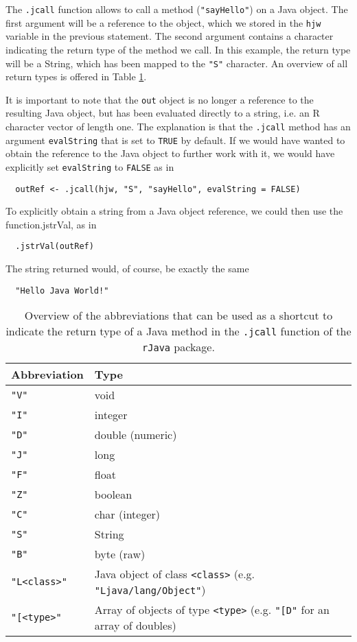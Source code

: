 \documentclass[a4paper, 11pt]{article}
\begin{document}
The \texttt{.jcall} function allows to call a method (\texttt{"sayHello"}) on a Java object.
The first argument will be a reference to the object, which we stored in the \texttt{hjw} variable
in the previous statement. The second argument contains a character indicating the return type
of the method we call. In this example, the return type will be a String, which has been mapped
to the \texttt{"S"} character. An overview of all return types is offered in Table 
\ref{tab:returntypes}. 

It is important to note that the \texttt{out} object is
no longer a reference to the resulting Java object, but has been evaluated directly
to a string, i.e. an R character vector of length one. The explanation is that the
\texttt{.jcall} method has an argument \texttt{evalString} that is set to 
\texttt{TRUE} by default. If we would have wanted to obtain the reference to
the Java object to further work with it, we would have explicitly 
set \texttt{evalString} to \texttt{FALSE} as in 

\begin{verbatim}
  outRef <- .jcall(hjw, "S", "sayHello", evalString = FALSE) 
\end{verbatim}

To explicitly obtain a string from a Java object reference,
we could then use the function{.jstrVal}, as in
\begin{verbatim}
  .jstrVal(outRef)
\end{verbatim}

The string returned would, of course, be exactly the same
\begin{verbatim}
  "Hello Java World!"
\end{verbatim}

\begin{table}
  \begin{tabular}{lp{8cm}}
  \hline
  Abbreviation   &  Type \\
  \hline
    \texttt{"V"} & void \\
    \texttt{"I"} & integer \\
    \texttt{"D"} & double (numeric) \\  
    \texttt{"J"} & long \\
    \texttt{"F"} & float \\
    \texttt{"Z"} & boolean \\
    \texttt{"C"} & char (integer)\\
    \texttt{"S"} & String \\
    \texttt{"B"} & byte (raw)\\
    \texttt{"L<class>"} & Java object of class \texttt{<class>} 
                       (e.g. \texttt{"Ljava/lang/Object"})\\
    \texttt{"[<type>"}  & Array of objects of type \texttt{<type>} 
                       (e.g. \texttt{"[D"} for an array of doubles)\\
  \hline
  \end{tabular}
  \caption{Overview of the abbreviations that can be used as a shortcut to indicate the
           return type of a Java method in the \texttt{.jcall} function of
           the \texttt{rJava} package.}
  \label{tab:returntypes}
\end{table} 
\end{document}
